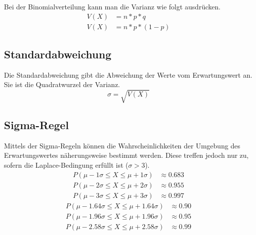 \documentclass[a4paper]{article}
\begin{document}
			\noindent
			Bei der Binomialverteilung kann man die Varianz wie folgt ausdrücken.
			\begin{equation}
				\begin{split}
					V(X) &= n * p * q\\
					V(X) &= n * p * (1-p)
				\end{split}
			\end{equation}
		\subsection{Standardabweichung}
			Die Standardabweichung gibt die Abweichung der Werte vom Erwartungswert an. Sie ist die Quadratwurzel der Varianz.
			\begin{equation}
				\sigma = \sqrt{V(X)}
			\end{equation}
		\subsection{Sigma-Regel}
			Mittels der Sigma-Regeln können die Wahrscheinlichkeiten der Umgebung des Erwartungswertes näherungsweise bestimmt werden. Diese treffen jedoch nur zu, sofern die Laplace-Bedingung erfüllt ist ($\sigma > 3$).
			\begin{subequations}
				\begin{align}
					P(\mu - 1\sigma \leq X \leq \mu + 1\sigma) &\approx 0.683\\
					P(\mu - 2\sigma \leq X \leq \mu + 2\sigma) &\approx 0.955\\
					P(\mu - 3\sigma \leq X \leq \mu + 3\sigma) &\approx 0.997
				\end{align}
			\end{subequations}
			\begin{subequations}
				\begin{align}
				P(\mu - 1.64\sigma \leq X \leq \mu + 1.64\sigma) &\approx 0.90\\
				P(\mu - 1.96\sigma \leq X \leq \mu + 1.96\sigma) &\approx 0.95\\
				P(\mu - 2.58\sigma \leq X \leq \mu + 2.58\sigma) &\approx 0.99
				\end{align}
			\end{subequations}
			
\end{document}
